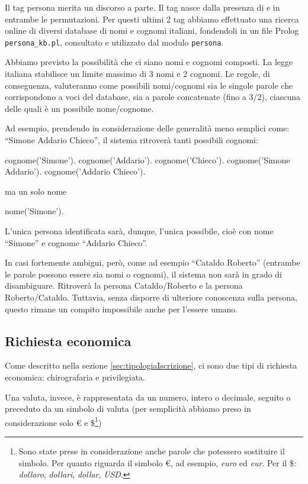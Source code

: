 Il tag persona merita un discorso a parte.
Il tag  nasce dalla presenza di  e  in entrambe le permutazioni.
Per questi ultimi 2 tag abbiamo effettuato una ricerca online di diversi database di nomi e cognomi italiani, fondendoli in un file Prolog \verb|persona_kb.pl|, consultato e utilizzato dal modulo \verb|persona|.

Abbiamo previsto la possibilità che ci siano nomi e cognomi composti. La legge italiana stabilisce un limite massimo di 3 nomi e 2 cognomi.
Le regole, di conseguenza, valuteranno come possibili nomi/cognomi sia le singole parole che corrispondono a voci del database, sia a parole concatenate (fino a 3/2), ciascuna delle quali è un possibile nome/cognome.

Ad esempio, prendendo in considerazione delle generalità meno semplici come: ``Simone Addario Chieco'', il sistema ritroverà tanti possibili cognomi:

\begin{prologcode}
cognome('Simone').
cognome('Addario').
cognome('Chieco').
cognome('Simone Addario').
cognome('Addario Chieco').
\end{prologcode}

ma un solo nome

\begin{prologcode}
nome('Simone').
\end{prologcode}

L'unica persona identificata sarà, dunque, l'unica possibile, cioè con nome ``Simone'' e cognome ``Addario Chieco''.

In casi fortemente ambigui, però, come ad esempio ``Cataldo Roberto'' (entrambe le parole possono essere sia nomi o cognomi), il sistema non sarà in grado di disambiguare. Ritroverà la persona Cataldo/Roberto e la persona Roberto/Cataldo. Tuttavia, senza disporre di ulteriore conoscenza sulla persona, questo rimane un compito impossibile anche per l'essere umano.

\subsection{Richiesta economica}

Come descritto nella sezione \ref{sec:tipologiaIscrizione}, ci sono due tipi di richiesta economica: chirografaria e privilegiata.

Una valuta, invece, è rappresentata da un numero, intero o decimale, seguito o preceduto da un simbolo di valuta (per semplicità abbiamo preso in considerazione solo € e \$\footnote{Sono state prese in considerazione anche parole che potessero sostituire il simbolo. Per quanto riguarda il simbolo €, ad esempio, \emph{euro} ed \emph{eur}. Per il \$: \emph{dollaro}, \emph{dollari}, \emph{dollar}, \emph{USD}.})

